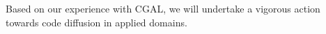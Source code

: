 
 Based on our experience with CGAL, we will undertake a vigorous action towards code diffusion in applied domains.


















